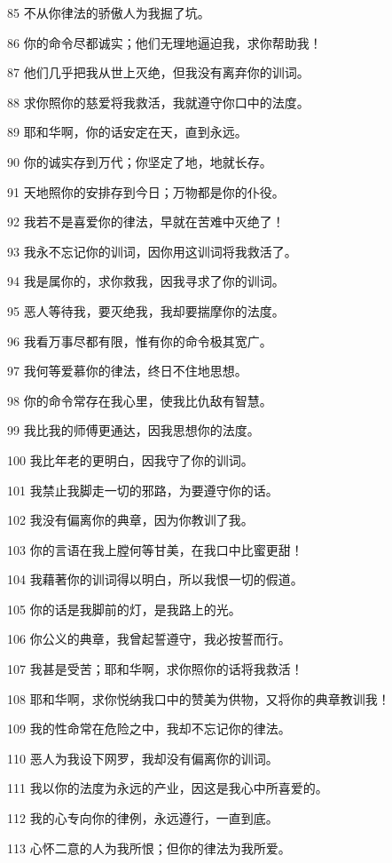 \par 85 不从你律法的骄傲人为我掘了坑。
\par 86 你的命令尽都诚实；他们无理地逼迫我，求你帮助我！
\par 87 他们几乎把我从世上灭绝，但我没有离弃你的训词。
\par 88 求你照你的慈爱将我救活，我就遵守你口中的法度。
\par 89 耶和华啊，你的话安定在天，直到永远。
\par 90 你的诚实存到万代；你坚定了地，地就长存。
\par 91 天地照你的安排存到今日；万物都是你的仆役。
\par 92 我若不是喜爱你的律法，早就在苦难中灭绝了！
\par 93 我永不忘记你的训词，因你用这训词将我救活了。
\par 94 我是属你的，求你救我，因我寻求了你的训词。
\par 95 恶人等待我，要灭绝我，我却要揣摩你的法度。
\par 96 我看万事尽都有限，惟有你的命令极其宽广。
\par 97 我何等爱慕你的律法，终日不住地思想。
\par 98 你的命令常存在我心里，使我比仇敌有智慧。
\par 99 我比我的师傅更通达，因我思想你的法度。
\par 100 我比年老的更明白，因我守了你的训词。
\par 101 我禁止我脚走一切的邪路，为要遵守你的话。
\par 102 我没有偏离你的典章，因为你教训了我。
\par 103 你的言语在我上膛何等甘美，在我口中比蜜更甜！
\par 104 我藉著你的训词得以明白，所以我恨一切的假道。
\par 105 你的话是我脚前的灯，是我路上的光。
\par 106 你公义的典章，我曾起誓遵守，我必按誓而行。
\par 107 我甚是受苦；耶和华啊，求你照你的话将我救活！
\par 108 耶和华啊，求你悦纳我口中的赞美为供物，又将你的典章教训我！
\par 109 我的性命常在危险之中，我却不忘记你的律法。
\par 110 恶人为我设下网罗，我却没有偏离你的训词。
\par 111 我以你的法度为永远的产业，因这是我心中所喜爱的。
\par 112 我的心专向你的律例，永远遵行，一直到底。
\par 113 心怀二意的人为我所恨；但你的律法为我所爱。
